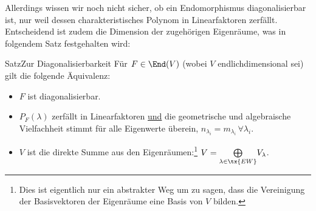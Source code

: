 Allerdings wissen wir noch nicht sicher, ob ein Endomorphismus diagonalisierbar ist, nur weil dessen charakteristisches Polynom in Linearfaktoren zerfällt. Entscheidend ist zudem die Dimension der zugehörigen Eigenräume, was in folgendem Satz festgehalten wird:
\begin{Satz}
{Satz}{Zur Diagonalisierbarkeit}
Für $F\in\End(V)$ (wobei $V$ endlichdimensional sei) gilt die folgende Äquivalenz:
\begin{itemize}
    \item $F$ ist diagonalisierbar.
    \item $P_F(\lambda)$ zerfällt in Linearfaktoren \underline{und} die geometrische und algebraische Vielfachheit stimmt für alle Eigenwerte überein, $n_{\lambda_i}=m_{\lambda_i}\,\forall \lambda_i$.
    \item $V$ ist die direkte Summe aus den Eigenräumen:\footnote{Dies ist eigentlich nur ein abstrakter Weg um zu sagen, dass die Vereinigung der Basisvektoren der Eigenräume eine Basis von $V$ bilden.} $V=\underset{\lambda\in\tx{EW}}{\bigoplus}V_\lambda$.
\end{itemize}
\end{Satz}
